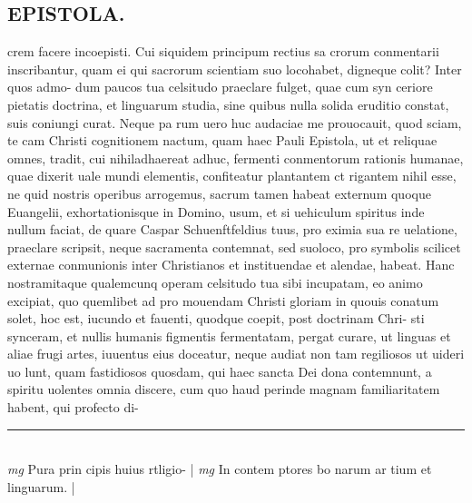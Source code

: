 \documentclass{article}
\begin{document}
\begin{pages}
\section*{EPISTOLA. }\pstart crem facere incoepisti. Cui siquidem principum rectius sa crorum conmentarii inscribantur, quam ei qui sacrorum scientiam suo locohabet, digneque colit? Inter quos admo- dum paucos tua celsitudo praeclare fulget, quae cum syn ceriore pietatis doctrina, et linguarum studia, sine quibus nulla solida eruditio constat, suis coniungi curat. Neque pa rum uero huc audaciae me prouocauit, quod sciam, te cam Christi cognitionem nactum, quam haec Pauli Epistola, ut et reliquae omnes, tradit, cui nihiladhaereat adhuc, fermenti conmentorum rationis humanae, quae dixerit uale mundi elementis, confiteatur plantantem ct rigantem nihil esse, ne quid nostris operibus arrogemus, sacrum tamen habeat externum quoque Euangelii, exhortationisque in Domino, usum, et si uehiculum spiritus inde nullum faciat, de quare Caspar Schuenftfeldius tuus, pro eximia sua re uelatione, praeclare scripsit, neque sacramenta contemnat, sed suoloco, pro symbolis scilicet externae conmunionis inter Christianos et instituendae et alendae, habeat.  \pend\pstart Hanc nostramitaque qualemcunq operam celsitudo tua sibi incupatam, eo animo excipiat, quo quemlibet ad pro mouendam Christi gloriam in quouis conatum solet, hoc est, iucundo et fauenti, quodque coepit, post doctrinam Chri- sti synceram, et nullis humanis figmentis fermentatam, pergat curare, ut linguas et aliae frugi artes, iuuentus eius doceatur, neque audiat non tam regiliosos ut uideri uo lunt, quam fastidiosos quosdam, qui haec sancta Dei dona contemnunt, a spiritu uolentes omnia discere, cum quo haud perinde magnam familiaritatem habent, qui profecto di-  \pend
\vspace{0.5cm}\noindent
\vspace{0.2cm}\rule{1cm}{0.2pt}\\ 
\hspace{0.2cm}\textit{mg}
\footnotesize Pura prin cipis huius rtligio- 
\normalsize| 
\hspace{0.2cm}\textit{mg}
\footnotesize In contem ptores bo narum ar tium et linguarum. 
\normalsize| 

\end{pages}
\end{document}
